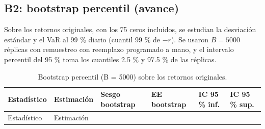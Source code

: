 \documentclass[
  spanish,
]{article}
\begin{document}
\subsection{B2: bootstrap percentil
(avance)}\label{b2-bootstrap-percentil-avance}

Sobre los retornos originales, con los 75 ceros incluidos, se estudian
la desviación estándar y el VaR al 99 \% diario (cuantil 99 \% de
\(-r\)). Se usaron \(B=5000\) réplicas con remuestreo con reemplazo
programado a mano, y el intervalo percentil del 95 \% toma los cuantiles
2.5 \% y 97.5 \% de las réplicas.

\begin{longtable}[]{@{}
  >{\raggedright\arraybackslash}p{}
  >{\raggedleft\arraybackslash}p{}
  >{\raggedleft\arraybackslash}p{}
  >{\raggedleft\arraybackslash}p{}
  >{\raggedleft\arraybackslash}p{}
  >{\raggedleft\arraybackslash}p{}@{}}
\caption{Bootstrap percentil (B = 5000) sobre los retornos
originales.}\tabularnewline
\toprule\noalign{}
\begin{minipage}[b]{\linewidth}\raggedright
Estadístico
\end{minipage} & \begin{minipage}[b]{\linewidth}\raggedleft
Estimación
\end{minipage} & \begin{minipage}[b]{\linewidth}\raggedleft
Sesgo bootstrap
\end{minipage} & \begin{minipage}[b]{\linewidth}\raggedleft
EE bootstrap
\end{minipage} & \begin{minipage}[b]{\linewidth}\raggedleft
IC 95 \% inf.
\end{minipage} & \begin{minipage}[b]{\linewidth}\raggedleft
IC 95 \% sup.
\end{minipage} \\
\midrule\noalign{}
\endfirsthead
\toprule\noalign{}
\begin{minipage}[b]{\linewidth}\raggedright
Estadístico
\end{minipage} & \begin{minipage}[b]{\linewidth}\raggedleft
Estimación
\end{minipage} & \begin{minipage}[b]{\linewidth}\raggedleft

\end{minipage}
\end{longtable}
\end{document}
